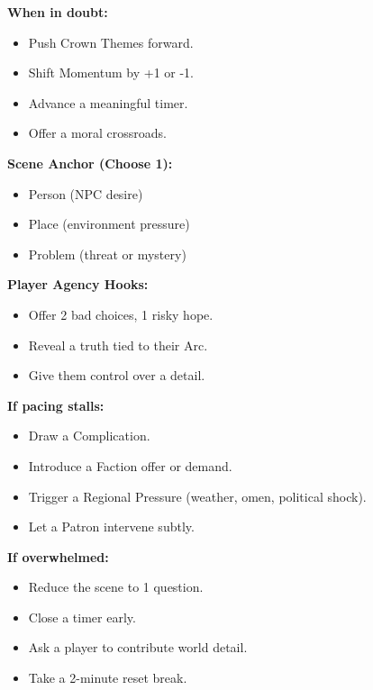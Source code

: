 \documentclass[11pt]{article}
\begin{document}
\begin{tcolorbox}[
  title=\textbf{GM Quick Reference},
  colback=gray!10,
  colframe=black,
  sharp corners,
  fonttitle=\bfseries
,breakable]

\textbf{When in doubt:}
\begin{itemize}
  \item Push Crown Themes forward.
  \item Shift Momentum by +1 or -1.
  \item Advance a meaningful timer.
  \item Offer a moral crossroads.
\end{itemize}

\textbf{Scene Anchor (Choose 1):}
\begin{itemize}
  \item Person (NPC desire)
  \item Place (environment pressure)
  \item Problem (threat or mystery)
\end{itemize}

\textbf{Player Agency Hooks:}
\begin{itemize}
  \item Offer 2 bad choices, 1 risky hope.
  \item Reveal a truth tied to their Arc.
  \item Give them control over a detail.
\end{itemize}

\textbf{If pacing stalls:}
\begin{itemize}
  \item Draw a Complication.
  \item Introduce a Faction offer or demand.
  \item Trigger a Regional Pressure (weather, omen, political shock).
  \item Let a Patron intervene subtly.
\end{itemize}

\textbf{If overwhelmed:}
\begin{itemize}
  \item Reduce the scene to 1 question.
  \item Close a timer early.
  \item Ask a player to contribute world detail.
  \item Take a 2-minute reset break.
\end{itemize}

\end{tcolorbox}
\end{document}
